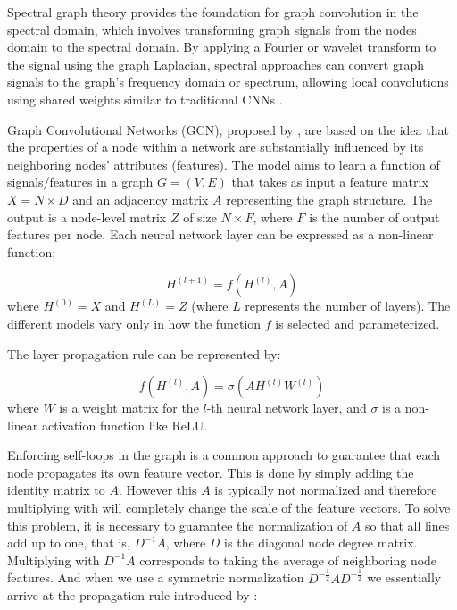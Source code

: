 Spectral graph theory provides the foundation for graph convolution in the spectral domain, which involves transforming graph signals from the nodes domain to the spectral domain. By applying a Fourier or wavelet transform to the signal using the graph Laplacian, spectral approaches can convert graph signals to the graph's frequency domain or spectrum, allowing local convolutions using shared weights similar to traditional CNNs \cite{georgousis2021graph}.

Graph Convolutional Networks (GCN), proposed by \citet{kipf2016semi}, are based on the idea that the properties of a node within a network are substantially influenced by its neighboring nodes' attributes (\ie features). The model aims to learn a function of signals/features in a graph $G = (V, E)$ that takes as input a feature matrix $X = N \times D$ and an adjacency matrix $A$ representing the graph structure. The output is a node-level matrix $Z$ of size $N \times F$, where $F$ is the number of output features per node. Each neural network layer can be expressed as a non-linear function:


\begin{equation}
\label{eq:non_linearfunc}
{H}^{(l+1)}=f(H^{(l)},A)
\end{equation}
where $H^{(0)} = X$ and $H^{(L)} = Z$ (where $L$ represents the number of layers). The different models vary only in how the function $f$ is selected and parameterized.


The layer propagation rule can be represented by:

\begin{equation}
\label{eq:pro_rule}
f(H^{(l)}, A) = \sigma(AH^{(l)}W^{(l)})
\end{equation}
where $W$ is a weight matrix for the $l$-th neural network layer, and $\sigma$ is a non-linear activation function like ReLU.


Enforcing self-loops in the graph is a common approach to guarantee that each node propagates its own feature vector. This is done by simply adding the identity matrix to $A$. However this $A$ is typically not normalized and therefore multiplying with will completely change the scale of the feature vectors. To solve this problem, it is necessary to guarantee the normalization of $A$ so that all lines add up to one, that is, $D^{-1}A$, where $D$ is the diagonal node degree matrix. Multiplying with $D^{-1}A$ corresponds to taking the average of neighboring node features. And when we use a symmetric normalization $D^{-\frac{1}{2}}AD^{-\frac{1}{2}}$ we essentially arrive at the propagation rule introduced by \citet{kipf2016semi}: 

